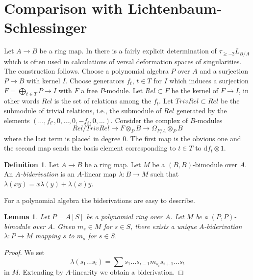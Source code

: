 \documentclass{stacks-project}
\theoremstyle{plain}
\newtheorem{lemma}[subsection]{Lemma}
\theoremstyle{definition}
\newtheorem{definition}[subsection]{Definition}
\theoremstyle{remark}
\numberwithin{equation}{subsection}
\begin{document}
\section{Comparison with Lichtenbaum-Schlessinger}
\label{section-compare-higher}

\noindent
Let $A \to B$ be a ring map. In \cite{Lichtenbaum-Schlessinger}
there is a fairly explicit determination of $\tau_{\geq -2}L_{B/A}$
which is often used in calculations of versal deformation spaces of
singularities. The construction follows.
Choose a polynomial algebra $P$ over $A$
and a surjection $P \to B$ with kernel $I$. Choose generators
$f_t$, $t \in T$ for $I$ which induces a surjection
$F = \bigoplus_{t \in T} P \to I$ with $F$ a free $P$-module.
Let $Rel \subset F$ be the kernel of $F \to I$, in other words
$Rel$ is the set of relations among the $f_t$. Let $TrivRel \subset Rel$
be the submodule of trivial relations, i.e., the submodule of $Rel$
generated by the elements $(\ldots, f_{t'}, 0, \ldots, 0, -f_t, 0, \ldots)$.
Consider the complex of $B$-modules
\begin{equation}
\label{equation-lichtenbaum-schlessinger}
Rel/TrivRel \longrightarrow
F \otimes_P B \longrightarrow
\Omega_{P/A} \otimes_P B
\end{equation}
where the last term is placed in degree $0$. The first map is the obvious
one and the second map sends the basis element corresponding to $t \in T$
to $\text{d}f_t \otimes 1$.

\begin{definition}
\label{definition-biderivation}
Let $A \to B$ be a ring map. Let $M$ be a $(B, B)$-bimodule
over $A$. An {\it $A$-biderivation} is an $A$-linear map $\lambda : B \to M$
such that $\lambda(xy) = x\lambda(y) + \lambda(x)y$.
\end{definition}

\noindent
For a polynomial algebra the biderivations are easy to describe.

\begin{lemma}
\label{lemma-polynomial-ring-unique}
Let $P = A[S]$ be a polynomial ring over $A$. Let $M$ be a $(P, P)$-bimodule
over $A$. Given $m_s \in M$ for $s \in S$, there exists a unique
$A$-biderivation $\lambda : P \to M$ mapping $s$ to $m_s$ for $s \in S$.
\end{lemma}

\begin{proof}
We set
$$
\lambda(s_1 \ldots s_t) =
\sum s_1 \ldots s_{i - 1} m_{s_i} s_{i + 1} \ldots s_t
$$
in $M$. Extending by $A$-linearity we obtain a biderivation.
\end{proof}
\end{document}
